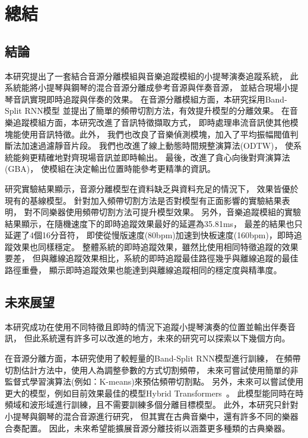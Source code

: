\documentclass[class=NCU_thesis, crop=false]{standalone}
\begin{document}
\chapter{總結}

\section{結論}
本研究提出了一套結合音源分離模組與音樂追蹤模組的小提琴演奏追蹤系統，
此系統能將小提琴與鋼琴的混合音源分離成參考音源與伴奏音源，
並結合現場小提琴音訊實現即時追蹤與伴奏的效果。
在音源分離模組方面，本研究採用Band-Split RNN模型
並提出了簡單的頻帶切割方法，有效提升模型的分離效果。
在音樂追蹤模組方面，本研究改進了音訊特徵擷取方式，
即時處理串流音訊使其他模塊能使用音訊特徵。此外，
我們也改良了音樂偵測模塊，加入了平均振幅閥值判斷法加速過濾靜音片段。
我們也改進了線上動態時間規整演算法(ODTW)，
使系統能夠更精確地對齊現場音訊並即時輸出。
最後，改進了貪心向後對齊演算法(GBA)，
使模組在決定輸出位置時能參考更精準的資訊。

研究實驗結果顯示，音源分離模型在資料缺乏與資料充足的情況下，
效果皆優於現有的基線模型。
針對加入頻帶切割方法是否對模型有正面影響的實驗結果表明，
對不同樂器使用頻帶切割方法可提升模型效果。
另外，音樂追蹤模組的實驗結果顯示，在隨機速度下的即時追蹤效果最好的延遲為35.81ms，
最差的結果也只延遲了4個16分音符，
即使從慢版速度(80bpm)加速到快板速度(160bpm)，即時追蹤效果也同樣穩定。
整體系統的即時追蹤效果，雖然比使用相同特徵追蹤的效果要差，
但與離線追蹤效果相比，系統的即時追蹤最佳路徑幾乎與離線追蹤的最佳路徑重疊，
顯示即時追蹤效果也能達到與離線追蹤相同的穩定度與精準度。

\pagebreak

\section{未來展望}
本研究成功在使用不同特徵且即時的情況下追蹤小提琴演奏的位置並輸出伴奏音訊，
但此系統還有許多可以改進的地方，未來的研究可以探索以下幾個方向。

在音源分離方面，本研究使用了較輕量的Band-Split RNN模型進行訓練，
在頻帶切割估計方法中，使用人為調整參數的方式切割頻帶，
未來可嘗試使用簡單的非監督式學習演算法(例如：K-means)來預估頻帶切割點。
另外，未來可以嘗試使用更大的模型，例如目前效果最佳的模型Hybrid Transformers~\cite{rouard2023hybrid}。
此模型能同時在時頻域和波形域進行訓練，且不需要訓練多個分離目標模型。
此外，本研究只針對小提琴與鋼琴的混合音源進行研究，
但其實在古典音樂中，還有許多不同的樂器合奏配置。
因此，未來希望能擴展音源分離技術以涵蓋更多種類的古典樂器。
\end{document}
